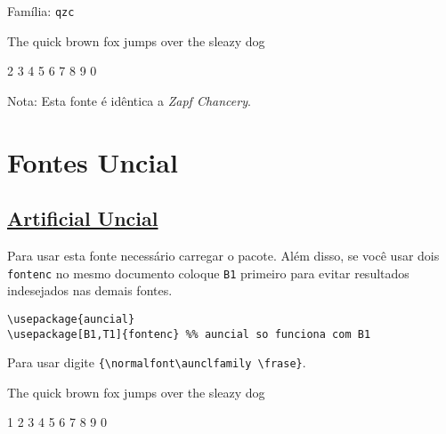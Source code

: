 \documentclass[a4paper]{article}
\newcommand{\frase}{The quick brown fox jumps over the sleazy dog}
\newcommand{\fonte}[2]{
  {\fontfamily{#1}\selectfont #2}
}
\begin{document}
Família: \texttt{qzc}

\fonte{qzc}{\frase}

\fonte{qzc}{1 2 3 4 5 6 7 8 9 0}

Nota: Esta fonte é idêntica a \textit{Zapf Chancery}.



% 
% 
% 
% 
% 
% 
% 
% 
% 
% 
% 
% 
% 
% 
% 





\section*{Fontes Uncial}

\subsection*{\href{http://www.tug.dk/FontCatalogue/auncial/}{Artificial Uncial}}

Para usar esta fonte necessário carregar o pacote. Além disso, se você usar dois \texttt{fontenc} no mesmo documento coloque \texttt{B1} primeiro para evitar resultados indesejados nas demais fontes.

\begin{verbatim}
\usepackage{auncial}
\usepackage[B1,T1]{fontenc} %% auncial so funciona com B1
\end{verbatim}

Para usar digite \verb|{\normalfont\aunclfamily \frase}|.

{\normalfont\aunclfamily \frase

1 2 3 4 5 6 7 8 9 0}
\end{document}
